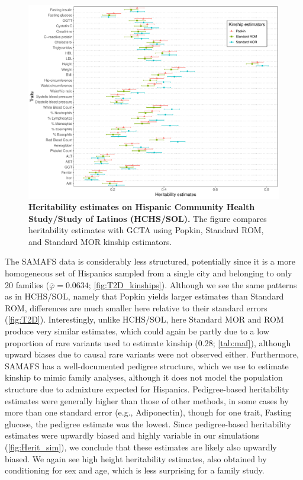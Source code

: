\documentclass[11pt]{article}
\begin{document}
\begin{figure}[bp!]
  \centering
  \includegraphics[width=\textwidth]{data/Fig2_HCHS_All_maf001_agesex.pdf}
  \caption{
    {\bf Heritability estimates on Hispanic Community Health Study/Study of Latinos (HCHS/SOL).}
    The figure compares heritability estimates with GCTA using Popkin, Standard ROM, and Standard MOR kinship estimators.
    }
  \label{fig:HCHS}
\end{figure}

The SAMAFS data is considerably less structured, potentially since it is a more homogeneous set of Hispanics sampled from a single city and belonging to only 20 families ($\bar{\varphi} = 0.0634$; \cref{fig:T2D_kinships}).
Although we see the same patterns as in HCHS/SOL, namely that Popkin yields larger estimates than Standard ROM, differences are much smaller here relative to their standard errors (\cref{fig:T2D}).
Interestingly, unlike HCHS/SOL, here Standard MOR and ROM produce very similar estimates, which could again be partly due to a low proportion of rare variants used to estimate kinship (0.28; \cref{tab:maf}), although upward biases due to causal rare variants were not observed either.
Furthermore, SAMAFS has a well-documented pedigree structure, which we use to estimate kinship to mimic family analyses, although it does not model the population structure due to admixture expected for Hispanics.
Pedigree-based heritability estimates were generally higher than those of other methods, in some cases by more than one standard error (e.g., Adiponectin), though for one trait, Fasting glucose, the pedigree estimate was the lowest.
Since pedigree-based heritability estimates were upwardly biased and highly variable in our simulations (\cref{fig:Herit_sim}), we conclude that these estimates are likely also upwardly biased.
We again see high height heritability estimates, also obtained by conditioning for sex and age, which is less surprising for a family study.
\end{document}
